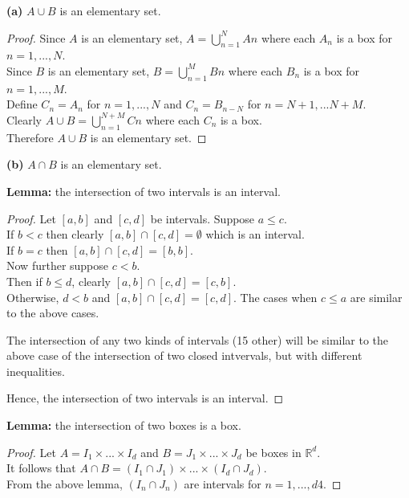 \documentclass[12pt]{article}
\begin{document}
	\hspace{-4 ex}\textbf{(a)} $A \cup B$ is an elementary set.
	
	
	\begin{proof}
		Since $A$ is an elementary set, $A = \bigcup_{n=1}^{N} A{n}$ where each $A_{n}$ is a box for $n=1,...,N$. \\
		Since $B$ is an elementary set, $B = \bigcup_{n=1}^{M} B{n}$ where each $B_{n}$ is a box for $n=1,...,M$. \\
		Define $C_{n} = A_{n}$ for $n=1,...,N$ and $C_{n} = B_{n-N}$ for $n=N+1,...N+M$. \\
		Clearly $A \cup B = \bigcup_{n=1}^{N+M} C{n}$ where each $C_{n}$ is a box. \\
		Therefore $A \cup B$ is an elementary set.
	\end{proof}

	\hspace{-4 ex}\textbf{(b)} $A \cap B$ is an elementary set. \bigbreak
	
	\textbf{Lemma:} the intersection of two intervals is an interval.
	
	\begin{proof}
		Let $[a,b]$ and $[c,d]$ be intervals. \bigbreak
		Suppose $a \leq c$. \\
		If $ b < c$ then clearly $[a,b] \cap [c,d] = \emptyset$ which is an interval. \\
		If $b=c$ then $[a,b] \cap [c,d] = [b,b]$. \\
		Now further suppose $ c < b$. \\
		Then if $b \leq d$, clearly $[a,b] \cap [c,d] = [c,b]$. \\
		Otherwise, $ d < b$ and $[a,b] \cap [c,d] = [c,d]$. \bigbreak
		The cases when $c \leq a$ are similar to the above cases. \bigbreak
		
		The intersection of any two kinds of intervals (15 other) will be similar to the above case of the intersection of two closed intvervals, but with different inequalities. \bigbreak
		
		Hence, the intersection of two intervals is an interval.		
	\end{proof}

	\textbf{Lemma:} the intersection of two boxes is a box.
	
	\begin{proof}
		Let $A = I_{1} \times ... \times I_{d}$ and $B = J_{1} \times ... \times J_{d}$ be boxes in $\mathds{R}^{d}$. \\
		It follows that $A \cap B = (I_{1} \cap J_{1}) \times ... \times (I_{d} \cap J_{d})$. \\
		From the above lemma, $(I_{n} \cap J_{n})$ are intervals for $n=1,...,d4$.
	\end{proof}
\end{document}
